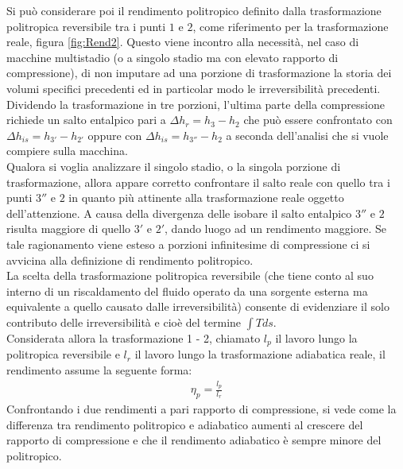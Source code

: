 Si può considerare poi il rendimento politropico definito dalla trasformazione politropica reversibile tra i punti $1$ e $2$, come riferimento per la trasformazione reale, figura \ref{fig:Rend2}. Questo viene incontro alla necessità, nel caso di macchine multistadio (o a singolo stadio ma con elevato rapporto di compressione), di non imputare ad una porzione di trasformazione la storia dei volumi specifici precedenti ed in particolar modo le irreversibilità precedenti.\\
Dividendo la trasformazione in tre porzioni, l'ultima parte della compressione richiede un salto entalpico pari a $\Delta h_r = h_3 - h_2$ che può essere confrontato con $\Delta h_{is} = h_{3'} - h_{2'}$ oppure con $\Delta h_{is} = h_{3''} - h_2$ a seconda dell'analisi che si vuole compiere sulla macchina.\\
Qualora si voglia analizzare il singolo stadio, o la singola porzione di trasformazione, allora appare corretto confrontare il salto reale con quello tra i punti $3''$ e $2$ in quanto più attinente alla trasformazione reale oggetto dell'attenzione. A causa della divergenza delle isobare il salto entalpico $3''$ e $2$ risulta maggiore di quello $3'$ e $2'$, dando luogo ad un rendimento maggiore. Se tale ragionamento viene esteso a porzioni infinitesime di compressione ci si avvicina alla definizione di rendimento politropico.\\
La scelta della trasformazione politropica reversibile (che tiene conto al suo interno di un riscaldamento del fluido operato da una sorgente esterna ma equivalente a quello causato dalle irreversibilità) consente di evidenziare il solo contributo delle irreversibilità e cioè del termine $\int Tds$.\\
Considerata allora la trasformazione 1 - 2, chiamato $l_p$ il lavoro lungo la politropica reversibile e $l_r$ il lavoro lungo la trasformazione adiabatica reale, il rendimento assume la seguente forma:
\begin{align*}
\eta_p = \frac{l_p}{l_r}
\end{align*}
Confrontando i due rendimenti a pari rapporto di compressione, si vede come la differenza tra rendimento politropico e adiabatico aumenti al crescere del rapporto di compressione e che il rendimento adiabatico è sempre minore del politropico.
